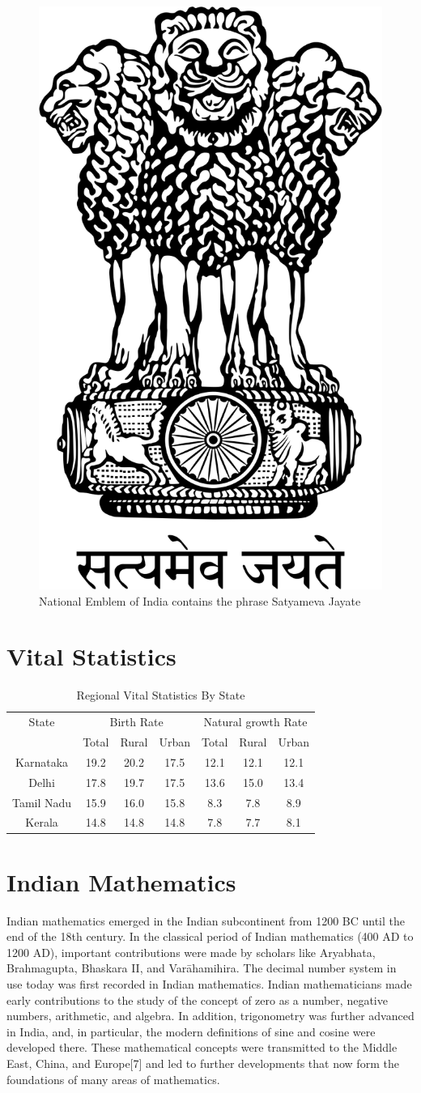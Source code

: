 \documentclass[12pt,a4paper]{article}
\begin{document}
\begin{figure}[h]
	\centering
	\includegraphics[width= 0.3\linewidth,height=0.3\linewidth]{../Images/emblem}
	\caption[National Emblem]{National Emblem of India contains the phrase Satyameva Jayate}
	\label{fig:emblem}
\end{figure}


\section{Vital Statistics}

\begin{table}[h]
	\centering
	\begin{tabular}{|c|c|c|c|c|c|c|}
		\hline
		State & \multicolumn{3}{|c|}{Birth Rate}&\multicolumn{3}{|c|}{Natural growth Rate}\\
		\cline{2-7}
		& Total & Rural & Urban &Total & Rural & Urban\\
		\hline
		Karnataka & 19.2 &	20.2 &	17.5 &12.1	&12.1&	12.1\\
		\hline
		Delhi &	17.8 & 	19.7	&17.5	&13.6&	15.0	&13.4\\
		\hline
		Tamil Nadu	&15.9&	16.0&	15.8	&8.3	&7.8	&8.9\\
		\hline
		Kerala&	14.8&	14.8&	14.8& 7.8&	7.7	&8.1\\
		\hline		
	\end{tabular}
	\caption[Vital Statistics]{Regional Vital Statistics By State }
	\label{table:statistics}
\end{table}


\section{Indian Mathematics}
Indian mathematics emerged in the Indian subcontinent from 1200 BC until the end of the 18th century. In the classical period of Indian mathematics (400 AD to 1200 AD), important contributions were made by scholars like Aryabhata, Brahmagupta, Bhaskara II, and Varāhamihira. The decimal number system in use today was first recorded in Indian mathematics. Indian mathematicians made early contributions to the study of the concept of zero as a number, negative numbers, arithmetic, and algebra. In addition, trigonometry was further advanced in India, and, in particular, the modern definitions of sine and cosine were developed there. These mathematical concepts were transmitted to the Middle East, China, and Europe[7] and led to further developments that now form the foundations of many areas of mathematics.
\end{document}

